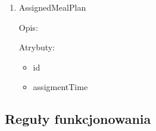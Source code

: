 \begin{enumerate}[label={\textbf{KAT/\protect\threedigits{\theenumi}}}, wide, labelwidth=!, labelindent=0pt]
    \item \label{kat:AssignedMealPlan} AssignedMealPlan

    Opis: \lipsum[1]
    \par
    Atrybuty:
    \begin{itemize}
        \item id
        \item assigmentTime
    \end{itemize}


\end{enumerate}

\subsection {Reguły funkcjonowania}

